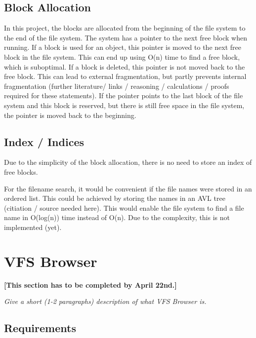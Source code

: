 \documentclass[a4paper,12pt]{article}
\begin{document}
{\subsection{Block Allocation}

In this project, the blocks are allocated from the beginning of the file system to the end of the file system. The system has a pointer to the next free block when running. If a block is used for an object, this pointer is moved
to the next free block in the file system. This can end up using O(n) time to find a free block, which is suboptimal. If a block is deleted,
this pointer is not moved back to the free block. This can lead to external fragmentation, but partly prevents internal fragmentation (further literature/ links / reasoning / calculations / 
proofs required for these statements). If the pointer points to the last block of the file system and this block is reserved, but there is still free space in the file system, the pointer is moved back to the beginning.

\subsection{Index / Indices}

Due to the simplicity of the block allocation, there is no need to store an index of free blocks.

For the filename search, it would be convenient if the file names were stored in an ordered list. This could be achieved by storing the names in an AVL tree (citiation / source needed here). This would enable the file system to
find a file name in O(log(n)) time instead of O(n). Due to the complexity, this is not implemented (yet).


}



\section{VFS Browser}

\textbf{[This section has to be completed by April 22nd.]}

\emph{Give a short (1-2 paragraphs) description of what VFS Browser is.}


\subsection{Requirements}
\end{document}
